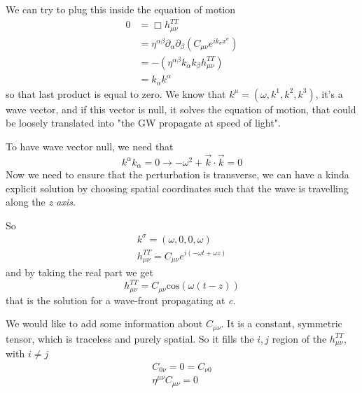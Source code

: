 We can try to plug this inside the equation of motion
\begin{align*}
	0 &= \Box h^{TT}_{\mu \nu }\\
	  &= \eta ^{\alpha \beta }\partial_{\alpha }\partial_{\beta }\left( C_{\mu \nu }e^{ik_{\sigma }x^{\sigma }} \right) \\
	  &= - \left( \eta ^{\alpha \beta }k_{\alpha }k_{\beta }h^{TT}_{\mu \nu } \right)\\
	  &= k_{\alpha }k^{\alpha }
\end{align*}
so that last product is equal to zero. We know that $k^{\mu } =\left( \omega , k^{1},k^{2},k^{3} \right)$, it's a wave vector, and if this vector is null, it solves the equation of motion, that could be loosely translated into "the GW propagate at speed of light".\par
To have wave vector null, we need that
\[
k^{\alpha }k_{\alpha } = 0 \to - \omega ^{2} + \vec{k}\cdot \vec{k}=0
\]
Now we need to ensure that the perturbation is transverse, we can have a kinda explicit solution by choosing spatial coordinates such that the wave is travelling along the \emph{z axis.}\par
So
\begin{align*}
k^{\sigma } = \left( \omega , 0,0, \omega  \right)\\
h^{TT}_{\mu \nu } = C_{\mu \nu }e^{i\left( -\omega t +\omega z \right)} 
\end{align*}
and by taking the real part we get
\[
h^{TT}_{\mu \nu } = C_{\mu \nu } \text{cos}\left( \omega \left( t-z \right) \right)
\]
that is the solution for a wave-front propagating at \emph{c}.\par
We would like to add some information about $C_{\mu \nu }$. It is a constant, symmetric tensor, which is traceless and purely spatial. So it fills the $i,j$ region of the $h_{\mu \nu }^{TT}$, with $i\neq j$
\begin{gather*}
C_{0\nu } = 0 = C_{\nu 0} \\
\eta ^{\mu \nu }C_{\mu \nu } = 0
\end{gather*}

